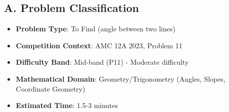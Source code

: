 \documentclass[12pt]{article}
\begin{document}
\begin{problemconfigbox}
\subsection*{A. Problem Classification}
\begin{itemize}[leftmargin=*]
    \item \textbf{Problem Type}: To Find (angle between two lines)
    \item \textbf{Competition Context}: AMC 12A 2023, Problem 11
    \item \textbf{Difficulty Band}: Mid-band (P11) - Moderate difficulty
    \item \textbf{Mathematical Domain}: Geometry/Trigonometry (Angles, Slopes, Coordinate Geometry)
    \item \textbf{Estimated Time}: 1.5-3 minutes
\end{itemize}


\end{problemconfigbox}
\end{document}
